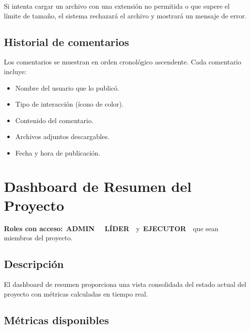 \documentclass[12pt, a4paper]{article}
\newcommand{\rolbadge}[2]{%
  \colorbox{#1}{\color{white}\footnotesize\bfseries\,#2\,}%
}
\newcommand{\admin}{\rolbadge{admincolor}{ADMIN}}
\newcommand{\leader}{\rolbadge{leadercolor}{LÍDER}}
\newcommand{\executor}{\rolbadge{executorcolor}{EJECUTOR}}
\begin{document}
\begin{warningbox}
Si intenta cargar un archivo con una extensión no permitida o que supere el límite de tamaño, el sistema rechazará el archivo y mostrará un mensaje de error.
\end{warningbox}

\subsection{Historial de comentarios}

Los comentarios se muestran en orden cronológico ascendente. Cada comentario incluye:
\begin{itemize}
  \item Nombre del usuario que lo publicó.
  \item Tipo de interacción (ícono de color).
  \item Contenido del comentario.
  \item Archivos adjuntos descargables.
  \item Fecha y hora de publicación.
\end{itemize}

\section{Dashboard de Resumen del Proyecto}

\begin{notebox}
\textbf{Roles con acceso:} \admin\ \leader\ y \executor\ que sean miembros del proyecto.
\end{notebox}

\subsection{Descripción}

El dashboard de resumen proporciona una vista consolidada del estado actual del proyecto con métricas calculadas en tiempo real.

\subsection{Métricas disponibles}
\end{document}
